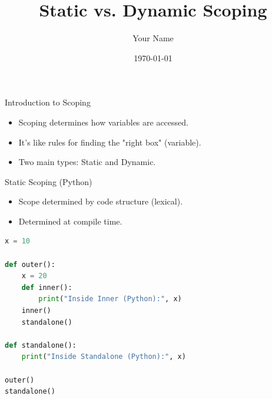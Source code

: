 \documentclass{beamer}
\title{Static vs. Dynamic Scoping}
\author{Your Name}
\date{\today}
\begin{document}
\begin{frame}
  \titlepage
\end{frame}

\begin{frame}{Introduction to Scoping}
  \begin{itemize}
    \item Scoping determines how variables are accessed.
    \item It's like rules for finding the "right box" (variable).
    \item Two main types: Static and Dynamic.
  \end{itemize}
\end{frame}

\begin{frame}[fragile]{Static Scoping (Python)}
  \begin{itemize}
    \item Scope determined by code structure (lexical).
    \item Determined at compile time.
  \end{itemize}
  \begin{lstlisting}[language=Python]
x = 10

def outer():
    x = 20
    def inner():
        print("Inside Inner (Python):", x)
    inner()
    standalone()

def standalone():
    print("Inside Standalone (Python):", x)

outer()
standalone()
  \end{lstlisting}
\end{frame}

\end{document}
